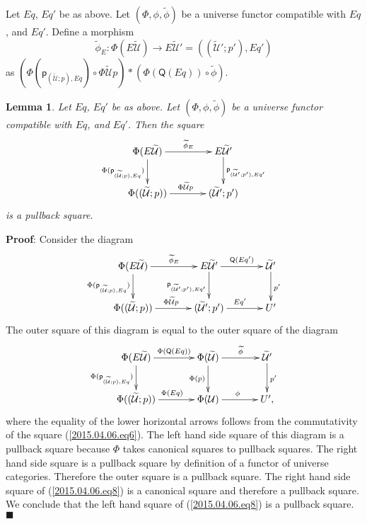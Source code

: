 \documentclass[12pt]{article}
\numberwithin{equation}{section}
\newenvironment{eq}{\begin{equation}}{\end{equation}}
\newenvironment{myproof}{{\bf Proof}:}{$\blacksquare$ \vskip 5mm }
\newtheorem{lemma}[proposition]{Lemma}
\newcommand{\llabel}[1]{\label{#1}}
\newcommand{\sr}{\rightarrow}
\newcommand{\wt}{\widetilde}
\newcommand{\p}{\mathsf{p}}
\newcommand{\U}{\mathcal{U}}
\newcommand{\Q}{\mathsf{Q}}
\begin{document}
%
Let $Eq$, $Eq'$ be as above. Let $(\Phi,\phi,\wt{\phi})$ be a universe functor
compatible with $Eq$, and $Eq'$. Define a morphism
%
$$\wt{\phi}_{E}:\Phi(E\wt{\U})\sr E\wt{\U}'=((\wt{\U}';p'),Eq')$$
%
as $(\Phi(\p_{(\wt{\U};p),Eq})\circ \Phi\wt{\U}p)*(\Phi(\Q(Eq))\circ \wt{\phi})$.
%
\begin{lemma}
\llabel{2015.04.06.l4} Let $Eq$, $Eq'$ be as above. Let $(\Phi,\phi,\wt{\phi})$
be a universe functor compatible with $Eq$, and $Eq'$. Then the square
%
$$
\begin{xy}
          \xymatrix@C=3pc{ \Phi(E\wt{\U}) \ar[r]^-{\wt{\phi}_{E}}
            \ar[d]_{\Phi(\p_{(\wt{\U};p),Eq})} & E\wt{\U}'
            \ar[d]^{\p_{(\wt{\U}';p'),Eq'}}\\ \Phi((\wt{\U};p))
            \ar[r]^{\Phi\wt{\U}p} & (\wt{\U}';p') }
\end{xy}
$$
%
is a pullback square.
%
\end{lemma} 
%
\begin{myproof}
Consider the diagram
%
\begin{eq}\llabel{2015.04.06.eq8}
\begin{xy}
          \xymatrix@C=3pc{ \Phi(E\wt{\U})
            \ar[r]^-{\wt{\phi}_{E}}\ar[d]_{\Phi(\p_{(\wt{\U};p),Eq})} & E\wt{\U}'
            \ar[r]^-{\Q(Eq')}\ar[d]_{\p_{(\wt{\U}';p'),Eq'}} & \wt{\U}'
            \ar[d]^{p'}\\ \Phi((\wt{\U};p)) \ar[r]^{\Phi\wt{\U}p} & (\wt{\U}';p')
            \ar[r]^{Eq'} & U' }
\end{xy}
\end{eq}%
%
The outer square of this diagram is equal to the outer square of the diagram
%
\begin{eq}\llabel{2015.04.06.eq7}
\begin{xy}
          \xymatrix@C=3pc{ \Phi(E\wt{\U})
            \ar[r]^-{\Phi(\Q(Eq))}\ar[d]_{\Phi(\p_{(\wt{\U};p),Eq})} &
            \Phi(\wt{\U}) \ar[r]^-{\wt{\phi}}\ar[d]_{\Phi(p)} & \wt{\U}'
            \ar[d]^{p'}\\ \Phi((\wt{\U};p)) \ar[r]^{\Phi(Eq)} & \Phi(\U)
            \ar[r]^{\phi} & U', }
\end{xy}
\end{eq}%
%
where the equality of the lower horizontal arrows follows from the
commutativity of the square (\ref{2015.04.06.eq6}). The left hand side square
of this diagram is a pullback square because $\Phi$ takes canonical squares to
pullback squares. The right hand side square is a pullback square by definition
of a functor of universe categories. Therefore the outer square is a pullback
square. The right hand side square of (\ref{2015.04.06.eq8}) is a canonical
square and therefore a pullback square. We conclude that the left hand square
of (\ref{2015.04.06.eq8}) is a pullback square.
\end{myproof}
\end{document}
